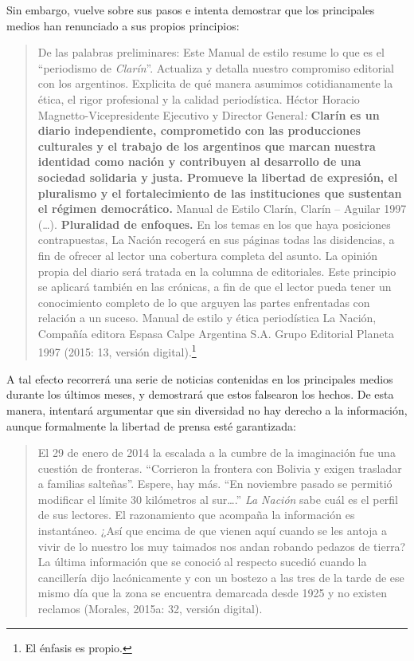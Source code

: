 Sin embargo, vuelve sobre sus pasos e intenta demostrar que los principales medios han renunciado a sus propios principios:

\begin{quote}
De las palabras preliminares: Este Manual de estilo resume lo que es el \enquote{periodismo de \emph{Clarín}}. Actualiza y detalla nuestro compromiso editorial con los argentinos. Explicita de qué manera asumimos cotidianamente la ética, el rigor profesional y la calidad periodística. Héctor Horacio Magnetto-Vicepresidente Ejecutivo y Director General\emph{:} \textbf{Clarín es un diario independiente, comprometido con las producciones culturales y el trabajo de los argentinos que marcan nuestra identidad como nación y contribuyen al desarrollo de una sociedad solidaria y justa. Promueve la libertad de expresión, el pluralismo y el fortalecimiento de las instituciones que sustentan el régimen democrático.} Manual de Estilo Clarín, Clarín -- Aguilar 1997 (\ldots). \textbf{Pluralidad de enfoques.} En los temas en los que haya posiciones contrapuestas, La Nación recogerá en sus páginas todas las disidencias, a fin de ofrecer al lector una cobertura completa del asunto. La opinión propia del diario será tratada en la columna de editoriales. Este principio se aplicará también en las crónicas, a fin de que el lector pueda tener un conocimiento completo de lo que arguyen las partes enfrentadas con relación a un suceso. Manual de estilo y ética periodística La Nación, Compañía editora Espasa Calpe Argentina S.A. Grupo Editorial Planeta 1997 (2015: 13, versión digital).\footnote{El énfasis es propio.}
\end{quote}

A tal efecto recorrerá una serie de noticias contenidas en los principales medios durante los últimos meses, y demostrará que estos falsearon los hechos. De esta manera, intentará argumentar que sin diversidad no hay derecho a la información, aunque formalmente la libertad de prensa esté garantizada:

\begin{quote}
El 29 de enero de 2014 la escalada a la cumbre de la imaginación fue una cuestión de fronteras. \enquote{Corrieron la frontera con Bolivia y exigen trasladar a familias salteñas}. Espere, hay más. \enquote{En noviembre pasado se permitió modificar el límite 30 kilómetros al sur\ldots.} \emph{La Nación} sabe cuál es el perfil de sus lectores. El razonamiento que acompaña la información es instantáneo. ¿Así que encima de que vienen aquí cuando se les antoja a vivir de lo nuestro los muy taimados nos andan robando pedazos de tierra? La última información que se conoció al respecto sucedió cuando la cancillería dijo lacónicamente y con un bostezo a las tres de la tarde de ese mismo día que la zona se encuentra demarcada desde 1925 y no existen reclamos (Morales, 2015a: 32, versión digital).
\end{quote}

